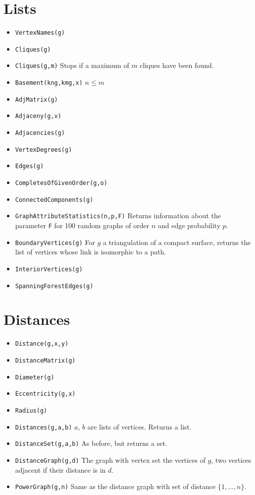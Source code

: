 \documentclass[11pt]{article}
\begin{document}
\begin{multicols}{3}
\section{Lists}
\label{sec:orga9787f5}
\begin{itemize}
\item \texttt{VertexNames(g)}
\item \texttt{Cliques(g)}
\item \texttt{Cliques(g,m)} Stops if a maximum of \(m\) cliques have been found.
\item \texttt{Basement(kng,kmg,x)} \(n\leq m\)
\item \texttt{AdjMatrix(g)}
\item \texttt{Adjaceny(g,v)}
\item \texttt{Adjacencies(g)}
\item \texttt{VertexDegrees(g)}
\item \texttt{Edges(g)}
\item \texttt{CompletesOfGivenOrder(g,o)}
\item \texttt{ConnectedComponents(g)}
\item \texttt{GraphAttributeStatistics(n,p,F)} Returns information about the
parameter \texttt{F} for 100 random graphs of order \(n\) and edge
probability \(p\).
\item \texttt{BoundaryVertices(g)} For \(g\) a triangulation of a compact
surface, returns the list of vertices whose link is isomorphic to a
path.
\item \texttt{InteriorVertices(g)}
\item \texttt{SpanningForestEdges(g)}
\end{itemize}

\section{Distances}
\label{sec:org56e38cd}
\begin{itemize}
\item \texttt{Distance(g,x,y)}
\item \texttt{DistanceMatrix(g)}
\item \texttt{Diameter(g)}
\item \texttt{Eccentricity(g,x)}
\item \texttt{Radius(g)}
\item \texttt{Distances(g,a,b)} \(a\), \(b\) are lists of vertices. Returns a list.
\item \texttt{DistanceSet(g,a,b)} As before, but returns a set.
\item \texttt{DistanceGraph(g,d)} The graph with vertex set the vertices of
\(g\), two vertices adjacent if their distance is in \(d\).
\item \texttt{PowerGraph(g,n)} Same as the distance graph with set of distance
\(\{1,\ldots,n\}\).
\end{itemize}


\end{multicols}
\end{document}
